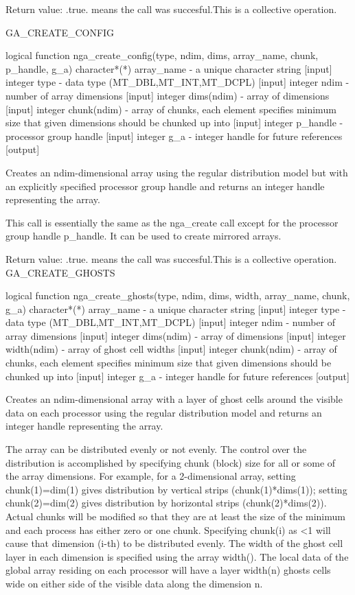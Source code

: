Return value: .true. means the call was succesful.This is a collective
operation.

GA\_CREATE\_CONFIG

logical function nga\_create\_config(type, ndim, dims, array\_name,
chunk, p\_handle, g\_a) character{*}({*}) array\_name - a unique character
string {[}input{]} integer type - data type (MT\_DBL,MT\_INT,MT\_DCPL)
{[}input{]} integer ndim - number of array dimensions {[}input{]}
integer dims(ndim) - array of dimensions {[}input{]} integer chunk(ndim)
- array of chunks, each element specifies minimum size that given
dimensions should be chunked up into {[}input{]} integer p\_handle
- processor group handle {[}input{]} integer g\_a - integer handle
for future references {[}output{]}

Creates an ndim-dimensional array using the regular distribution model
but with an explicitly specified processor group handle and returns
an integer handle representing the array.

This call is essentially the same as the nga\_create call except for
the processor group handle p\_handle. It can be used to create mirrored
arrays.

Return value: .true. means the call was succesful.This is a collective
operation. GA\_CREATE\_GHOSTS

logical function nga\_create\_ghosts(type, ndim, dims, width, array\_name,
chunk, g\_a) character{*}({*}) array\_name - a unique character string
{[}input{]} integer type - data type (MT\_DBL,MT\_INT,MT\_DCPL) {[}input{]}
integer ndim - number of array dimensions {[}input{]} integer dims(ndim)
- array of dimensions {[}input{]} integer width(ndim) - array of ghost
cell widths {[}input{]} integer chunk(ndim) - array of chunks, each
element specifies minimum size that given dimensions should be chunked
up into {[}input{]} integer g\_a - integer handle for future references
{[}output{]}

Creates an ndim-dimensional array with a layer of ghost cells around
the visible data on each processor using the regular distribution
model and returns an integer handle representing the array.

The array can be distributed evenly or not evenly. The control over
the distribution is accomplished by specifying chunk (block) size
for all or some of the array dimensions. For example, for a 2-dimensional
array, setting chunk(1)=dim(1) gives distribution by vertical strips
(chunk(1){*}dims(1)); setting chunk(2)=dim(2) gives distribution by
horizontal strips (chunk(2){*}dims(2)). Actual chunks will be modified
so that they are at least the size of the minimum and each process
has either zero or one chunk. Specifying chunk(i) as <1 will cause
that dimension (i-th) to be distributed evenly. The width of the ghost
cell layer in each dimension is specified using the array width().
The local data of the global array residing on each processor will
have a layer width(n) ghosts cells wide on either side of the visible
data along the dimension n.

